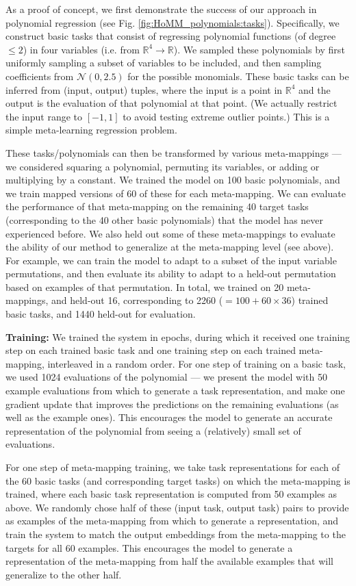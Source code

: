 As a proof of concept, we first demonstrate the success of our approach in polynomial regression (see Fig. \ref{fig:HoMM_polynomials:tasks}). Specifically, we construct basic tasks that consist of regressing polynomial functions (of degree \(\leq 2\)) in four variables (i.e. from \(\mathbb{R}^4 \rightarrow \mathbb{R}\)). We sampled these polynomials by first uniformly sampling a subset of variables to be included, and then sampling coefficients from \(\mathcal{N}(0, 2.5)\) for the possible monomials. These basic tasks can be inferred from (input, output) tuples, where the input is a point in \(\mathbb{R}^4\) and the output is the evaluation of that polynomial at that point. (We actually restrict the input range to \([-1, 1]\) to avoid testing extreme outlier points.) This is a simple meta-learning regression problem. 

These tasks/polynomials can then be transformed by various meta-mappings --- we considered squaring a polynomial, permuting its variables, or adding or multiplying by a constant. We trained the model on 100 basic polynomials, and we train mapped versions of 60 of these for each meta-mapping. We can evaluate the performance of that meta-mapping on the remaining 40 target tasks (corresponding to the 40 other basic polynomials) that the model has never experienced before. We also held out some of these meta-mappings to evaluate the ability of our method to generalize at the meta-mapping level (see above). For example, we can train the model to adapt to a subset of the input variable permutations, and then evaluate its ability to adapt to a held-out permutation based on examples of that permutation. In total, we trained on 20 meta-mappings, and held-out 16, corresponding to 2260 (\(=100 + 60 \times 36 \)) trained basic tasks, and 1440 held-out for evaluation. 

\textbf{Training:} We trained the system in epochs, during which it received one training step on each trained basic task and one training step on each trained meta-mapping, interleaved in a random order. For one step of training on a basic task, we used 1024 evaluations of the polynomial --- we present the model with 50 example evaluations from which to generate a task representation, and make one gradient update that improves the predictions on the remaining evaluations (as well as the example ones). This encourages the model to generate an accurate representation of the polynomial from seeing a (relatively) small set of evaluations. 

For one step of meta-mapping training, we take task representations for each of the 60 basic tasks (and corresponding target tasks) on which the meta-mapping is trained, where each basic task representation is computed from 50 examples as above. We randomly chose half of these (input task, output task) pairs to provide as examples of the meta-mapping from which to generate a representation, and train the system to match the output embeddings from the meta-mapping to the targets for all 60 examples. This encourages the model to generate a representation of the meta-mapping from half the available examples that will generalize to the other half.

